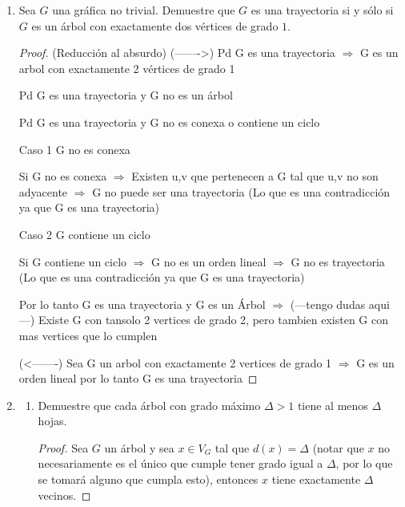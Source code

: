\documentclass{article}
\begin{document}
  \begin{enumerate}
    \item Sea $G$ una gr\'afica no trivial.   Demuestre
      que $G$ es una trayectoria si y s\'olo si $G$ es
      un \'arbol con exactamente dos v\'ertices de
      grado $1$.

      \begin{proof} (Reducción al absurdo)
        (------->) Pd G es una trayectoria $\Longrightarrow$ G es un arbol con exactamente 2 vértices de grado 1

        Pd G es una trayectoria  y G no es un árbol

        Pd G es una trayectoria  y G no es conexa o contiene un ciclo

        Caso 1 G no es conexa

        Si G no es conexa $\Longrightarrow$ Existen  u,v que pertenecen a G tal que u,v no son adyacente $\Longrightarrow$ G no puede ser una trayectoria (Lo que es una contradicción ya que G es una trayectoria)

        Caso 2 G contiene un ciclo

        Si G contiene un ciclo $\Longrightarrow$  G no es un orden lineal  $\Longrightarrow$ G no es trayectoria (Lo que es una contradicción ya que G es una trayectoria)

        Por lo tanto G es una trayectoria y G es un Árbol $\Longrightarrow$ (---tengo dudas aqui---) Existe G con tansolo 2 vertices de grado 2, pero tambien existen G con mas vertices que lo cumplen


        (<-------) Sea G un arbol con exactamente 2 vertices de grado 1  $\Longrightarrow$ G es un orden lineal por lo tanto G es una trayectoria

      \end{proof}

    \item \begin{enumerate}
      \item Demuestre que cada \'arbol con grado m\'aximo
        $\Delta > 1$ tiene al menos $\Delta$ hojas.

        \renewcommand\qedsymbol{QED}
        \begin{proof}
          Sea $G$ un \'arbol y sea $x \in V_G$ tal que $d(x) = \Delta$ (notar que $x$
          no necesariamente es el \'unico que cumple tener grado igual a $\Delta$, por
          lo que se tomar\'a alguno que cumpla esto), entonces $x$ tiene exactamente
          $\Delta$ vecinos.


\end{proof}
\end{enumerate}
\end{enumerate}
\end{document}
